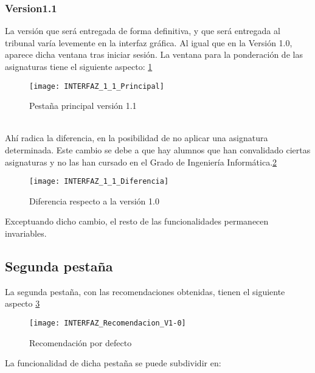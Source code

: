 \subsubsection{Version1.1}
La versión que será entregada de forma definitiva, y que será entregada al tribunal varía levemente en la interfaz gráfica. Al igual que en la Versión 1.0, aparece dicha ventana tras iniciar sesión. La ventana para la ponderación de las asignaturas tiene el siguiente aspecto: \ref{fig:E.2.5.1}
\begin{figure}[h]
\centering
\texttt{[image: INTERFAZ\_1\_1\_Principal]}
\caption{Pestaña principal versión 1.1}
\label{fig:E.2.5.1}
\end{figure}
\\Ahí radica la diferencia, en la posibilidad de no aplicar una asignatura determinada. Este cambio se debe a que hay alumnos que han convalidado ciertas asignaturas y no las han cursado en el Grado de Ingeniería Informática.\ref{fig:E.2.5.2}
\begin{figure}[h]
\centering
\texttt{[image: INTERFAZ\_1\_1\_Diferencia]}
\caption{Diferencia respecto a la  versión 1.0}
\label{fig:E.2.5.2}
\end{figure} 
Exceptuando dicho cambio, el resto de las funcionalidades permanecen invariables. 

\subsection{Segunda pestaña}
La segunda pestaña, con las recomendaciones obtenidas, tienen el siguiente aspecto \ref{fig:E.2.6}
\begin{figure}[h]
\centering
\texttt{[image: INTERFAZ\_Recomendacion\_V1-0]}
\caption{Recomendación por defecto}
\label{fig:E.2.6}
\end{figure}
La funcionalidad de dicha pestaña se puede subdividir en: 
